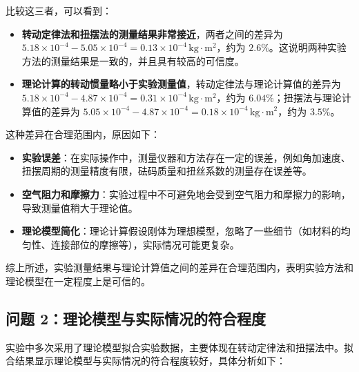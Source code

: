 \documentclass[UTF8]{ctexart}
\begin{document}
比较这三者，可以看到：

\begin{itemize}
    \item \textbf{转动定律法和扭摆法的测量结果非常接近}，两者之间的差异为 \(5.18 \times 10^{-4} - 5.05 \times 10^{-4} = 0.13 \times 10^{-4} \, \text{kg} \cdot \text{m}^2\)，约为 \(2.6\%\)。这说明两种实验方法的测量结果是一致的，并且具有较高的可信度。
    \item \textbf{理论计算的转动惯量略小于实验测量值}，转动定律法与理论计算值的差异为 \(5.18 \times 10^{-4} - 4.87 \times 10^{-4} = 0.31 \times 10^{-4} \, \text{kg} \cdot \text{m}^2\)，约为 \(6.04\%\)；扭摆法与理论计算值的差异为 \(5.05 \times 10^{-4} - 4.87 \times 10^{-4} = 0.18 \times 10^{-4} \, \text{kg} \cdot \text{m}^2\)，约为 \(3.5\%\)。
\end{itemize}

这种差异在合理范围内，原因如下：

\begin{itemize}
    \item \textbf{实验误差}：在实际操作中，测量仪器和方法存在一定的误差，例如角加速度、扭摆周期的测量精度有限，砝码质量和扭丝系数的测量存在误差等。
    \item \textbf{空气阻力和摩擦力}：实验过程中不可避免地会受到空气阻力和摩擦力的影响，导致测量值稍大于理论值。
    \item \textbf{理论模型简化}：理论计算假设刚体为理想模型，忽略了一些细节（如材料的均匀性、连接部位的摩擦等），实际情况可能更复杂。
\end{itemize}

综上所述，实验测量结果与理论计算值之间的差异在合理范围内，表明实验方法和理论模型在一定程度上是可信的。

\subsection{问题 2：理论模型与实际情况的符合程度}

实验中多次采用了理论模型拟合实验数据，主要体现在转动定律法和扭摆法中。拟合结果显示理论模型与实际情况的符合程度较好，具体分析如下：
\end{document}
